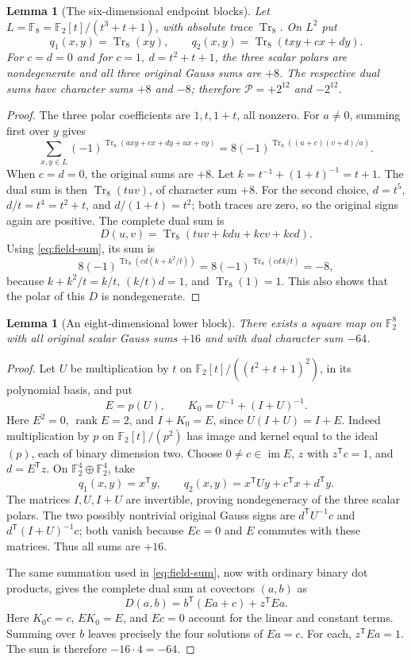 \documentclass[11pt,a4paper]{article}
\newtheorem{lemma}[theorem]{Lemma}
\theoremstyle{definition}
\theoremstyle{remark}
\numberwithin{equation}{section}
\newcommand{\F}{\mathbb F}
\newcommand{\Tr}{\operatorname{Tr}}
\newcommand{\im}{\operatorname{im}}
\newcommand{\Pm}{\mathcal P}
\begin{document}
\begin{lemma}[The six-dimensional endpoint blocks]\label{lem:F8}
Let \(L=\F_8=\F_2[t]/(t^3+t+1)\), with absolute trace \(\Tr_8\).
On \(L^2\) put
\[
 q_1(x,y)=\Tr_8(xy),\qquad
 q_2(x,y)=\Tr_8(txy+cx+dy).
\]
For \(c=d=0\) and for \(c=1,\ d=t^2+t+1\), the three scalar polars are
nondegenerate and all three original Gauss sums are \(+8\).
The respective dual sums have character sums \(+8\) and \(-8\);
therefore \(\Pm=+2^{12}\) and \(-2^{12}\).
\end{lemma}
\begin{proof}
The three polar coefficients are \(1,t,1+t\), all nonzero.
For \(a\ne0\), summing first over \(y\) gives
\begin{equation}\label{eq:field-sum}
 \sum_{x,y\in L}(-1)^{\Tr_8(axy+cx+dy+ux+vy)}
 =8(-1)^{\Tr_8((u+c)(v+d)/a)}.
\end{equation}
When \(c=d=0\), the original sums are \(+8\).
Let \(k=t^{-1}+(1+t)^{-1}=t+1\). The dual sum is then
\(\Tr_8(tuv)\), of character sum \(+8\).
For the second choice, \(d=t^5\),
\(d/t=t^4=t^2+t\), and \(d/(1+t)=t^2\);
both traces are zero, so the original signs again are positive.
The complete dual sum is
\[
 D(u,v)=\Tr_8(tuv+kdu+kcv+kcd).
\]
Using \eqref{eq:field-sum}, its sum is
\[
 8(-1)^{\Tr_8(cd(k+k^2/t))}
 =8(-1)^{\Tr_8(cd\,k/t)}=-8,
\]
because \(k+k^2/t=k/t\), \((k/t)d=1\), and \(\Tr_8(1)=1\).
This also shows that the polar of this \(D\) is nondegenerate.
\end{proof}

\begin{lemma}[An eight-dimensional lower block]\label{lem:attain8}
There exists a square map on \(\F_2^8\) with all original scalar Gauss
sums \(+16\) and with dual character sum \(-64\).
\end{lemma}
\begin{proof}
Let \(U\) be multiplication by \(t\) on
\(\F_2[t]/((t^2+t+1)^2)\), in its polynomial basis, and put
\[
 E=p(U),\qquad K_0=U^{-1}+(I+U)^{-1}.
\]
Here \(E^2=0\), \(\operatorname{rank}E=2\), and
\(I+K_0=E\), since \(U(I+U)=I+E\).
Indeed multiplication by \(p\) on \(\F_2[t]/(p^2)\) has image and
kernel equal to the ideal \((p)\), each of binary dimension two.
Choose \(0\ne c\in\im E\), \(z\) with \(z^{\mathsf T}c=1\), and
\(d=E^{\mathsf T}z\). On \(\F_2^4\oplus\F_2^4\), take
\[
 q_1(x,y)=x^{\mathsf T}y,\qquad
 q_2(x,y)=x^{\mathsf T}Uy+c^{\mathsf T}x+d^{\mathsf T}y.
\]
The matrices \(I,U,I+U\) are invertible, proving nondegeneracy of the
three scalar polars. The two possibly nontrivial original Gauss signs
are \(d^{\mathsf T}U^{-1}c\) and
\(d^{\mathsf T}(I+U)^{-1}c\); both vanish because \(Ec=0\) and \(E\)
commutes with these matrices. Thus all sums are \(+16\).

The same summation used in \eqref{eq:field-sum}, now with ordinary
binary dot products, gives the complete dual sum at covectors
\((a,b)\) as
\[
 D(a,b)=b^{\mathsf T}(Ea+c)+z^{\mathsf T}Ea.
\]
Here \(K_0c=c\), \(EK_0=E\), and \(Ec=0\) account for the linear and
constant terms. Summing over \(b\) leaves precisely the four solutions
of \(Ea=c\). For each, \(z^{\mathsf T}Ea=1\).
The sum is therefore \(-16\cdot4=-64\).
\end{proof}
\end{document}
